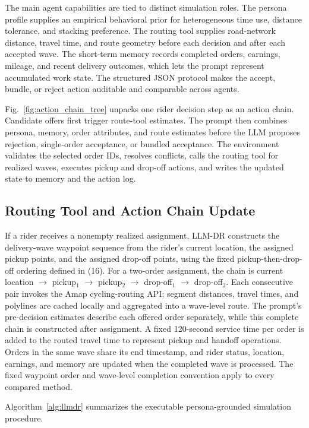 \documentclass[letterpaper,journal]{IEEEtran}
\begin{document}
The main agent capabilities are tied to distinct simulation roles. The persona profile supplies an empirical behavioral prior for heterogeneous time use, distance tolerance, and stacking preference. The routing tool supplies road-network distance, travel time, and route geometry before each decision and after each accepted wave. The short-term memory records completed orders, earnings, mileage, and recent delivery outcomes, which lets the prompt represent accumulated work state. The structured JSON protocol makes the accept, bundle, or reject action auditable and comparable across agents.

Fig.~\ref{fig:action_chain_tree} unpacks one rider decision step as an action chain. Candidate offers first trigger route-tool estimates. The prompt then combines persona, memory, order attributes, and route estimates before the LLM proposes rejection, single-order acceptance, or bundled acceptance. The environment validates the selected order IDs, resolves conflicts, calls the routing tool for realized waves, executes pickup and drop-off actions, and writes the updated state to memory and the action log.

\subsection{Routing Tool and Action Chain Update}
If a rider receives a nonempty realized assignment, LLM-DR constructs the delivery-wave waypoint sequence from the rider's current location, the assigned pickup points, and the assigned drop-off points, using the fixed pickup-then-drop-off ordering defined in (16). For a two-order assignment, the chain is current location $\rightarrow$ pickup$_1$ $\rightarrow$ pickup$_2$ $\rightarrow$ drop-off$_1$ $\rightarrow$ drop-off$_2$. Each consecutive pair invokes the Amap cycling-routing API; segment distances, travel times, and polylines are cached locally and aggregated into a wave-level route. The prompt's pre-decision estimates describe each offered order separately, while this complete chain is constructed after assignment. A fixed 120-second service time per order is added to the routed travel time to represent pickup and handoff operations. Orders in the same wave share its end timestamp, and rider status, location, earnings, and memory are updated when the completed wave is processed. The fixed waypoint order and wave-level completion convention apply to every compared method.

Algorithm~\ref{alg:llmdr} summarizes the executable persona-grounded simulation procedure.
\end{document}

